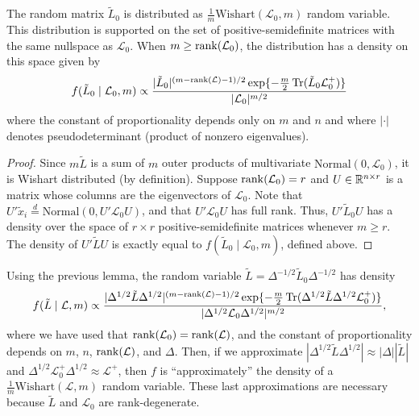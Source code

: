 \begin{lemma}\label{L:approx-wishart}
  The random matrix $\tilde L_0$ is distributed as $\tfrac{1}{m}
  \mathrm{Wishart }(\mathcal{L}_0, m)$ random variable.
  This distribution is supported on the set of
  positive-semidefinite matrices with the same nullspace as $\mathcal{L}_0$.  When
  $m \geq \operatorname*{rank}(\mathcal{L}_0)$, the distribution has a density on this space
  given by
  \begin{equation}\label{E:wishart-density}
   f( \tilde L_0 \mid \mathcal{L}_0, m)
      \propto
      \frac{|\tilde L_0|^{(m - \operatorname*{rank}(\mathcal{L}) - 1)/2}
        \exp\{-\tfrac{m}{2} \operatorname*{Tr}(\tilde L_0 \mathcal{L}_0^+) \}}
        {|\mathcal{L}_0|^{m/2}}
  \end{equation}
  where the constant of proportionality depends only on $m$ and $n$
  and where $|\cdot|$ denotes pseudodeterminant (product of nonzero
  eigenvalues).
\end{lemma}
\begin{proof}
  Since $m \tilde L$ is a sum of $m$ outer products of multivariate
  $\mathrm{Normal}(0, \mathcal{L}_0)$, it is Wishart distributed
  (by definition).
  Suppose $\operatorname*{rank}(\mathcal{L}_0) = r$ and
  $U \in \mathbb{R}^{n \times r}$ is a matrix whose columns are the
    eigenvectors of $\mathcal{L}_0$.  Note that
    $U' \tilde x_i \overset{d}{=} \mathrm{Normal}(0, U' \mathcal{L}_0 U)$,
    and that $U' \mathcal{L}_0 U$ has full rank.  Thus,
    \(
      U' \tilde L_0 U
    \)
    has a density over the space of $r \times r$ positive-semidefinite
    matrices whenever $m \geq r$.  The density of $U' \tilde L U$ is
    exactly equal to $f(\tilde L_0 \mid \mathcal{L}_0, m)$,
    defined above.
\end{proof}


Using the previous lemma, the random variable $\tilde L = \Delta^{-1/2} \tilde L_0
\Delta^{-1/2}$ has density
\[
  f(\tilde L \mid \mathcal{L}, m)
    \propto
     \frac{|\Delta^{1/2} \tilde L \Delta^{1/2}|^{(m - \operatorname*{rank}(\mathcal{L}) - 1)/2}
        \exp\{-\tfrac{m}{2} \operatorname*{Tr}(\Delta^{1/2} \tilde L \Delta^{1/2} \mathcal{L}_0^+) \}}
        {|\Delta^{1/2} \mathcal{L}_0 \Delta^{1/2}|^{m/2}},
\]
where we have used that $\operatorname*{rank}(\mathcal{L}_0) = \operatorname*{rank}(\mathcal{L})$, and
the constant of proportionality depends on $m$, $n$,
$\operatorname*{rank}(\mathcal{L})$, and $\Delta$.  
Then, if we approximate 
$| \Delta^{1/2} \tilde L \Delta^{1/2}| \approx |\Delta| |\tilde L|$ and
$\Delta^{1/2} \mathcal{L}_0^+ \Delta^{1/2} \approx \mathcal{L}^+$,
then $f$ is ``approximately''  the density of a $\tfrac{1}{m}
\mathrm{Wishart }(\mathcal{L}, m)$ random variable.  These last
approximations are necessary because $\tilde L$ and $\mathcal{L}_0$
are rank-degenerate.

